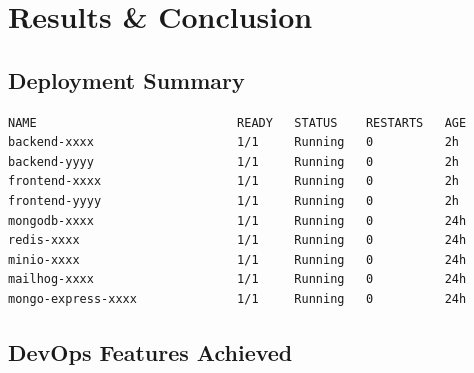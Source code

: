 \documentclass[12pt,a4paper]{report}
\begin{document}
\chapter{Results \& Conclusion}

\section{Deployment Summary}

\begin{successbox}
\begin{verbatim}
NAME                            READY   STATUS    RESTARTS   AGE
backend-xxxx                    1/1     Running   0          2h
backend-yyyy                    1/1     Running   0          2h
frontend-xxxx                   1/1     Running   0          2h
frontend-yyyy                   1/1     Running   0          2h
mongodb-xxxx                    1/1     Running   0          24h
redis-xxxx                      1/1     Running   0          24h
minio-xxxx                      1/1     Running   0          24h
mailhog-xxxx                    1/1     Running   0          24h
mongo-express-xxxx              1/1     Running   0          24h
\end{verbatim}
\end{successbox}

\section{DevOps Features Achieved}
\end{document}
